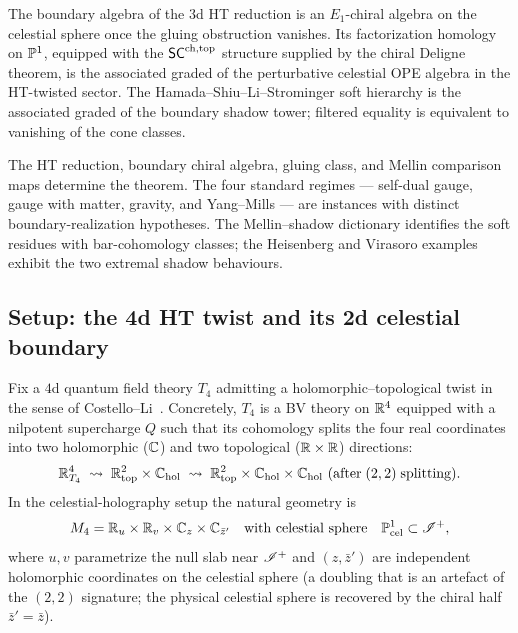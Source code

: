 The boundary algebra of the $3$d HT reduction is an $E_1$-chiral
algebra on the celestial sphere once the gluing obstruction vanishes.
Its factorization homology on $\mathbb P^1$, equipped with the $\mathsf{SC}^{\mathrm{ch,top}}$
structure supplied by the chiral Deligne theorem, is the associated
graded of the perturbative celestial OPE algebra in the HT-twisted
sector. The Hamada--Shiu--Li--Strominger soft hierarchy is the
associated graded of the boundary shadow tower; filtered equality is
equivalent to vanishing of the cone classes.

The HT reduction, boundary chiral algebra, gluing class, and Mellin
comparison maps determine the theorem. The four standard regimes ---
self-dual gauge, gauge with matter, gravity, and Yang--Mills --- are
instances with distinct boundary-realization hypotheses. The
Mellin--shadow dictionary identifies the soft residues with
bar-cohomology classes; the Heisenberg and Virasoro examples
exhibit the two extremal shadow behaviours.

\subsection{Setup: the 4d HT twist and its 2d celestial boundary}
\label{subsec:uch-setup}

Fix a $4$d quantum field theory $T_4$ admitting a holomorphic--topological
twist in the sense of Costello--Li~\cite{CostelloLiTwistedSugra,
CostelloLiSugraTwist}. Concretely, $T_4$ is a BV theory on $\mathbb R^4$
equipped with a nilpotent supercharge $Q$ such that its cohomology
splits the four real coordinates into two holomorphic ($\mathbb C$) and two
topological ($\mathbb R \times \mathbb R$) directions:
\[
\mathbb R^4_{T_4}
\;\leadsto\;
\mathbb R^2_{\text{top}} \times \mathbb C_{\text{hol}}
\;\leadsto\;
\mathbb R^2_{\text{top}} \times \mathbb C_{\text{hol}} \times \mathbb C_{\text{hol}}
\text{ (after}\;(2,2)\;\text{splitting)}.
\]
In the celestial-holography setup the natural geometry is
\begin{equation}
\label{eq:uch-geometry}
M_4 = \mathbb R_u \times \mathbb R_v \times \mathbb C_z \times \mathbb C_{\bar z'}
\quad\text{with celestial sphere}\quad
\mathbb P^1_{\text{cel}} \subset \mathscr I^+,
\end{equation}
where $u, v$ parametrize the null slab near $\mathscr I^+$ and $(z, \bar z')$
are independent holomorphic coordinates on the celestial sphere (a
doubling that is an artefact of the $(2,2)$ signature; the physical
celestial sphere is recovered by the chiral half
$\bar z' = \bar z$).


